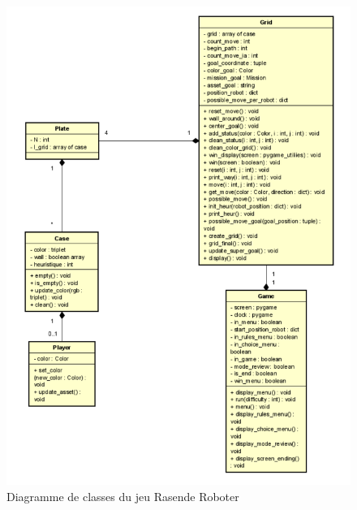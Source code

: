 \documentclass{article}
\begin{document}
\begin{figure}
  \centering  
  \includegraphics[width=1\textwidth]{diagram_class.png}  
  \caption{Diagramme de classes du jeu Rasende Roboter} 
  \label{fig:Diagram}  
\end{figure}\\
\end{document}
